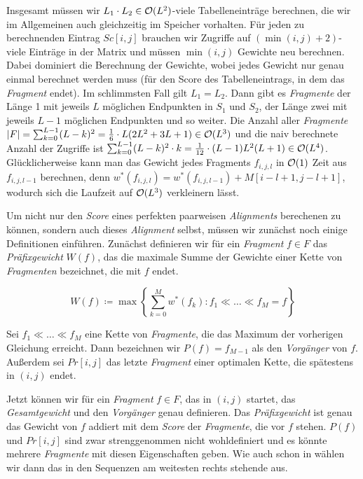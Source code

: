 \begin{beweis}
	Insgesamt müssen wir $L_1 \cdot L_2 \in \mathcal{O}(L^2)$-viele Tabelleneinträge berechnen, die wir im Allgemeinen auch gleichzeitig im Speicher vorhalten. Für jeden zu berechnenden Eintrag $Sc[i,j]$ brauchen wir Zugriffe auf $(\min(i,j) + 2)$-viele Einträge in der Matrix und müssen $\min(i,j)$ Gewichte neu berechnen. Dabei dominiert die Berechnung der Gewichte, wobei jedes Gewicht nur genau einmal berechnet werden muss (für den Score des Tabelleneintrags, in dem das \emph{Fragment} endet). Im schlimmsten Fall gilt $L_1 = L_2$. Dann gibt es \emph{Fragmente} der Länge 1 mit jeweils $L$ möglichen Endpunkten in $S_1$ und $S_2$, der Länge zwei mit jeweils $L-1$ möglichen Endpunkten und so weiter. Die Anzahl aller \emph{Fragmente} $|F| = \sum_{k=0}^{L-1}(L-k)^2 = \frac{1}{6} \cdot L(2L^2+3L+1) \in \mathcal{O}(L^3)$ und die naiv berechnete Anzahl der Zugriffe ist $\sum_{k=0}^{L-1}(L-k)^2\cdot k = \frac{1}{12} \cdot (L-1)L^2(L+1) \in \mathcal{O}(L^4)$. Glücklicherweise kann man das Gewicht jedes Fragments $f_{i,j,l}$ in $\mathcal{O}(1)$ Zeit aus $f_{i,j,l-1}$ berechnen, denn $w^*(f_{i,j,l}) = w^*(f_{i,j,l-1}) + M[i\!-\!l\!+\!1, j\!-\!l\!+\!1]$, wodurch sich die Laufzeit auf $\mathcal{O}(L^3)$ verkleinern lässt.
\end{beweis}

Um nicht nur den \emph{Score} eines perfekten paarweisen \emph{Alignments} berechenen zu können, sondern auch dieses \emph{Alignment} selbst, müssen wir zunächst noch einige Definitionen einführen. Zunächst definieren wir für ein \emph{Fragment} $f \in F$ das \emph{Präfixgewicht} $W(f)$, das die maximale Summe der Gewichte einer Kette von \emph{Fragmenten} bezeichnet, die mit $f$ endet.

\begin{equation}
	W(f) \coloneqq \max \left\{ \sum_{k=0}^{M} w^*(f_k) : f_1 \ll \dots \ll f_M=f \right\}
\end{equation}

\begin{definition}[Vorgänger]
	Sei $f_1 \ll \dots \ll f_M$ eine Kette von \emph{Fragmente}, die das Maximum der vorherigen Gleichung erreicht. Dann bezeichnen wir $P(f) = f_{M-1}$ als den \emph{Vorgänger} von $f$. Außerdem sei $Pr[i,j]$ das letzte \emph{Fragment} einer optimalen Kette, die spätestens in $(i,j)$ endet. 
\end{definition}

Jetzt können wir für ein \emph{Fragment} $f \in F$, das in $(i,j)$ startet, das \emph{Gesamtgewicht} und den \emph{Vorgänger} genau definieren. Das \emph{Präfixgewicht} ist genau das Gewicht von $f$ addiert mit dem \emph{Score} der \emph{Fragmente}, die vor $f$ stehen. $P(f)$ und $Pr[i,j]$ sind zwar strenggenommen nicht wohldefiniert und es könnte mehrere \emph{Fragmente} mit diesen Eigenschaften geben. Wie auch schon in \cite{mdw96} wählen wir dann das in den Sequenzen am weitesten rechts stehende aus.

